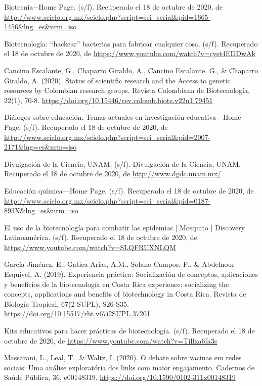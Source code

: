 \documentclass[12pt]{article}
\begin{document}
\begin{thebibliography}{X}
	 Biotecnia$-$Home Page. (s/f). Recuperado el 18 de octubre de 2020, de \url{http://www.scielo.org.mx/scielo.php?script=sci_serial&pid=1665-1456&lng=es&nrm=iso}

	 Biotecnología: “hackear” bacterias para fabricar cualquier cosa. (s/f). Recuperado el 18 de octubre de 2020, de \url{https://www.youtube.com/watch?v=cyst4EDDwAk}
	
	 Cancino Escalante, G., Chaparro Giraldo, A., Cancino Escalante, G., \& Chaparro Giraldo, A. (2020). Status of scientific research and the Access to genetic resources by Colombian research groups. Revista Colombiana de Biotecnología, 22(1), 70-8. \url{https://doi.org/10.15446/rev.colomb.biote.v22n1.79451}

	 Diálogos sobre educación. Temas actuales en investigación educativa—Home Page. (s/f). Recuperado el 18 de octubre de 2020, de \url{http://www.scielo.org.mx/scielo.php?script=sci_serial&pid=2007-2171&lng=es&nrm=iso}
	
	 Divulgación de la Ciencia, UNAM. (s/f). Divulgación de la Ciencia, UNAM. Recuperado el 18 de octubre de 2020, de \url{http://www.dgdc.unam.mx/}
	
	 Educación química—Home Page. (s/f). Recuperado el 18 de octubre de 2020, de \url{http://www.scielo.org.mx/scielo.php?script=sci_serial&pid=0187-893X&lng=es&nrm=iso}
	
	 El uso de la biotecnología para combatir las epidemias $|$ Mosquito $|$ Discovery Latinoamérica. (s/f). Recuperado el 18 de octubre de 2020, de \url{https://www.youtube.com/watch?v=SLQFRUXNLQM}
	
	 García Jiménez, E., Gatica Arias, A.M., Solano Campos, F., \& Abdelnour Esquivel, A. (2019). Experiencia práctica: Socialización de conceptos, aplicaciones y beneficios de la biotecnología en Costa Rica experience: socializing the concepts, applications and benefits of biotechnology in Costa Rica. Revista de Biología Tropical, 67(2 SUPL), S26-S35. \url{https://doi.org/10.15517/rbt.v67i2SUPL.37201}
	
	 Kits educativos para hacer prácticas de biotecnología. (s/f). Recuperado el 18 de octubre de 2020, de \url{https://www.youtube.com/watch?v=Tillxa6fa3s}
	
	 Massarani, L., Leal, T., \& Waltz, I. (2020). O debate sobre vacinas em redes sociais: Uma análise exploratória dos links com maior engajamento. Cadernos de Saúde Pública, 36, e00148319. \url{https://doi.org/10.1590/0102-311x00148319}
	

\end{thebibliography}
\end{document}
